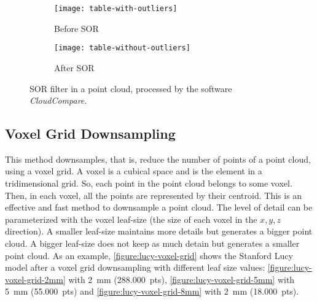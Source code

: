 \begin{figure}[h]
    
    \centering
    \begin{subfigure}[t]{0.5\textwidth}
        
        \centering
        \texttt{[image: table-with-outliers]}
        \caption{Before SOR}
        \label{figure:sor-filter-before}
    \end{subfigure}%
    \begin{subfigure}[t]{0.5\textwidth}
        \centering
        \texttt{[image: table-without-outliers]}
        \caption{After SOR}
        \label{figure:sor-filter-after}
    \end{subfigure}

    \caption{SOR filter in a point cloud, processed by the software \textit{CloudCompare}.}
    \label{figure:sor-filter}
\end{figure}

\subsection{Voxel Grid Downsampling}

This method downsamples, that is, reduce the number of points of a point cloud, using a voxel grid. A voxel is a cubical space and is the element in a tridimensional grid. So, each point in the point cloud belongs to some voxel. Then, in each voxel, all the points are represented by their centroid. This is an effective and fast method to downsample a point cloud. The level of detail can be parameterized with the voxel leaf-size (the size of each voxel in the $x,y,z$ direction). A smaller leaf-size maintains more details but generates a bigger point cloud. A bigger leaf-size does not keep as much detain but generates a smaller point cloud. As an example, \cref{figure:lucy-voxel-grid} shows the Stanford Lucy model \cite{stanford-scanning-rep} after a voxel grid downsampling with different leaf size values: \cref{figure:lucy-voxel-grid-2mm} with \SI{2}{\milli\meter} (288.000~pts), \cref{figure:lucy-voxel-grid-5mm} with \SI{5}{\milli\meter} (55.000~pts) and \cref{figure:lucy-voxel-grid-8mm} with \SI{2}{\milli\meter} (18.000~pts).

